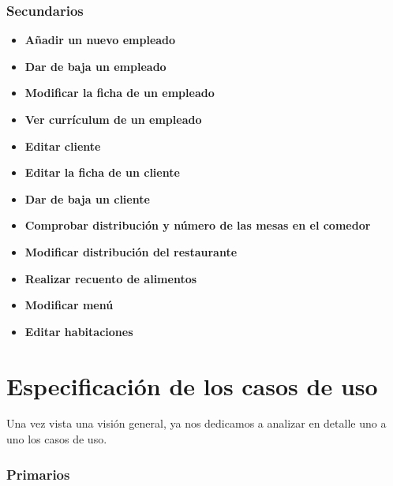 \documentclass[spanish,a4paper,11pt, twoside]{report}	%
\begin{document}
\section{Secundarios}			%
	\begin{itemize}
	\item \textbf{Añadir un nuevo empleado}
	\item \textbf{Dar de baja un empleado}
	\item \textbf{Modificar la ficha de un empleado}
	\item \textbf{Ver currículum de un empleado}
	\item \textbf{Editar cliente}
	\item \textbf{Editar la ficha de un cliente}
	\item \textbf{Dar de baja un cliente}
	\item \textbf{Comprobar distribución y número de las mesas en el comedor}
	\item \textbf{Modificar distribución del restaurante}
	\item \textbf{Realizar recuento de alimentos}
	\item \textbf{Modificar menú}
	\item \textbf{Editar habitaciones}

	\end{itemize}


\newpage
\mbox{}
\thispagestyle{empty}						%
\newpage

\setcounter{section}{0}

\part{Especificación de los casos de uso} %
Una vez vista una visión general, ya nos dedicamos a analizar en detalle uno a uno los casos de uso.
\section{Primarios}		 			

\end{document}
